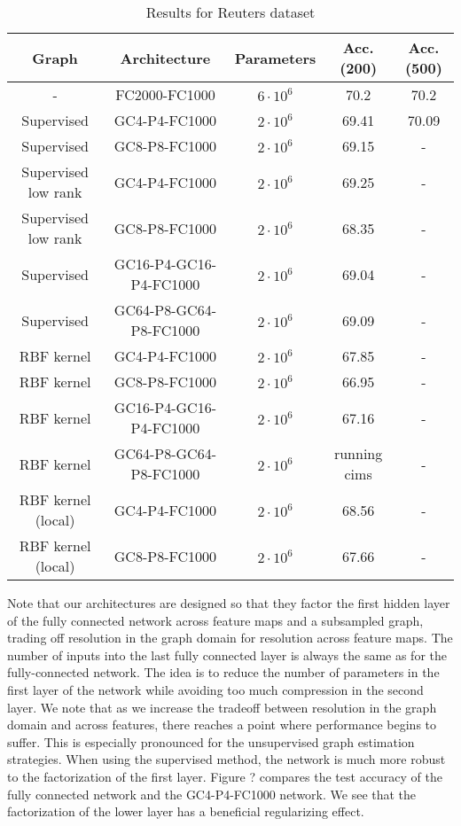 \begin{table}[H]
\caption{Results for Reuters dataset}
\begin{center}
\begin{tabular}{|c|c|c|c|c|}
\hline
Graph & Architecture & Parameters & Acc. (200) & Acc. (500)\\
\hline
- &FC2000-FC1000 & $6 \cdot 10^6$ & 70.2 & 70.2 \\
Supervised & GC4-P4-FC1000 & $2\cdot 10^6$ & 69.41 & 70.09 \\
Supervised & GC8-P8-FC1000 & $2 \cdot 10^6$ & 69.15 & - \\
Supervised low rank & GC4-P4-FC1000 & $2\cdot 10^6$ & 69.25 & - \\
Supervised low rank & GC8-P8-FC1000 & $2 \cdot 10^6$ & 68.35 & - \\
Supervised & GC16-P4-GC16-P4-FC1000& $2 \cdot 10^6$ & 69.04 & - \\
Supervised &GC64-P8-GC64-P8-FC1000 & $2 \cdot 10^6$ & 69.09 & - \\
RBF kernel & GC4-P4-FC1000 & $2\cdot 10^6$ & 67.85 & - \\
RBF kernel & GC8-P8-FC1000 & $2 \cdot 10^6$ & 66.95 & - \\
RBF kernel & GC16-P4-GC16-P4-FC1000 & $2 \cdot 10^6$ & 67.16 & - \\
RBF kernel & GC64-P8-GC64-P8-FC1000 & $2 \cdot 10^6$ & running cims & - \\
RBF kernel (local)& GC4-P4-FC1000 & $2\cdot 10^6$ & 68.56 & - \\
RBF kernel (local) & GC8-P8-FC1000 & $2 \cdot 10^6$ & 67.66 & - \\
\hline
\end{tabular}
\end{center}
\end{table}

Note that our architectures are designed so that they factor the first hidden layer of the fully connected network across feature maps and a subsampled graph, trading off resolution in the graph domain for resolution across feature maps. The number of inputs into the last fully connected layer is always the same as for the fully-connected network. The idea is to reduce the number of parameters in the first layer of the network while avoiding too much compression in the second layer. 
We note that as we increase the tradeoff between resolution in the graph domain and across features, there reaches a point where performance begins to suffer. This is especially pronounced for the unsupervised graph estimation strategies. When using the supervised method, the network is much more robust to the factorization of the first layer. Figure ? compares the test accuracy of the fully connected network and the GC4-P4-FC1000 network. We see that the factorization of the lower layer has a beneficial regularizing effect. 

